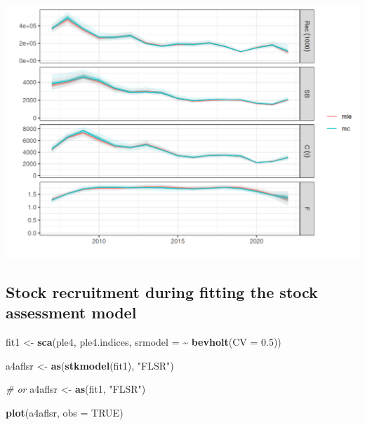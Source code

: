 \documentclass[
]{book}
\newenvironment{Shaded}{\begin{snugshade}}{\end{snugshade}}
\newcommand{\AttributeTok}[1]{\textcolor[rgb]{0.13,0.29,0.53}{#1}}
\newcommand{\CommentTok}[1]{\textcolor[rgb]{0.56,0.35,0.01}{\textit{#1}}}
\newcommand{\ConstantTok}[1]{\textcolor[rgb]{0.56,0.35,0.01}{#1}}
\newcommand{\FloatTok}[1]{\textcolor[rgb]{0.00,0.00,0.81}{#1}}
\newcommand{\FunctionTok}[1]{\textcolor[rgb]{0.13,0.29,0.53}{\textbf{#1}}}
\newcommand{\NormalTok}[1]{#1}
\newcommand{\OtherTok}[1]{\textcolor[rgb]{0.56,0.35,0.01}{#1}}
\newcommand{\SpecialCharTok}[1]{\textcolor[rgb]{0.81,0.36,0.00}{\textbf{#1}}}
\newcommand{\StringTok}[1]{\textcolor[rgb]{0.31,0.60,0.02}{#1}}
\begin{document}
\includegraphics{_bookdown_files/_main_files/figure-html/unnamed-chunk-88-1.png}

\hypertarget{stock-recruitment-during-fitting-the-stock-assessment-model}{%
\subsection{Stock recruitment during fitting the stock assessment model}\label{stock-recruitment-during-fitting-the-stock-assessment-model}}

\begin{Shaded}
\begin{Highlighting}[]
\NormalTok{fit1 }\OtherTok{\textless{}{-}} \FunctionTok{sca}\NormalTok{(ple4, ple4.indices, }\AttributeTok{srmodel =} \SpecialCharTok{\textasciitilde{}} \FunctionTok{bevholt}\NormalTok{(}\AttributeTok{CV =} \FloatTok{0.5}\NormalTok{))}

\NormalTok{a4aflsr }\OtherTok{\textless{}{-}} \FunctionTok{as}\NormalTok{(}\FunctionTok{stkmodel}\NormalTok{(fit1), }\StringTok{"FLSR"}\NormalTok{)}

\CommentTok{\# or}
\NormalTok{a4aflsr }\OtherTok{\textless{}{-}} \FunctionTok{as}\NormalTok{(fit1, }\StringTok{"FLSR"}\NormalTok{)}

\FunctionTok{plot}\NormalTok{(a4aflsr, }\AttributeTok{obs =} \ConstantTok{TRUE}\NormalTok{)}
\end{Highlighting}
\end{Shaded}
\end{document}
